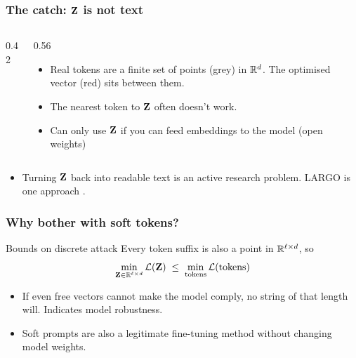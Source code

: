 \begin{frame}
\frametitle{The catch: $\mathbf{Z}$ is not text}
\begin{columns}[T]
\begin{column}{0.42\textwidth}
\centering
{}
\end{column}
\begin{column}{0.56\textwidth}
\begin{itemize}
    \item Real tokens are a finite set of points (grey) in $\mathbb{R}^d$. The
    optimised vector (red) sits between them.
    \item The nearest token to $\mathbf{Z}$ often doesn't work.
    \item Can only use $\mathbf{Z}$ if you can feed embeddings to the model (open weights)
\end{itemize}
\end{column}
\end{columns}
\vspace{0.3cm}
\begin{itemize}
    \item Turning $\mathbf{Z}$ back into readable text is an active research
    problem. LARGO is one approach \parencite{largo2025}.
\end{itemize}
\end{frame}

\begin{frame}
\frametitle{Why bother with soft tokens?}
\begin{block}{Bounds on discrete attack}
Every token suffix is also a point in $\mathbb{R}^{\ell\times d}$, so
$$
\min_{\mathbf{Z} \in \mathbb{R}^{\ell\times d}} \mathcal{L}(\mathbf{Z})
\;\le\;
\min_{\text{tokens}} \mathcal{L}(\text{tokens})
$$
\end{block}
\begin{itemize}
    \item If even free vectors cannot make the model comply, no string of that
    length will. Indicates model robustness.
    \item Soft prompts are also a legitimate fine-tuning method
    \parencite{lester2021power, li2021prefix} without changing model weights.
\end{itemize}
\end{frame}
